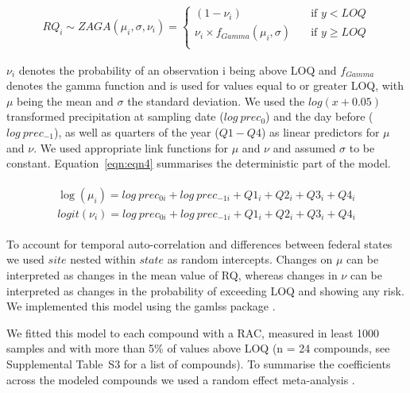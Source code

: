 \documentclass[journal=esthag,manuscript=article]{achemso}
\begin{document}
\begin{align}
RQ_i \sim ZAGA(\mu_i, \sigma, \nu_i) = 
  \begin{cases}
    (1 - \nu_i)   & \quad  \text{if } y < LOQ \\
    \nu_i \times f_{Gamma} (\mu_i, \sigma) & \quad \text{if } y \ge LOQ \\
  \end{cases}
  \label{eqn:eqn3}
\end{align}

$\nu_i$ denotes the probability of an observation i being above LOQ and $f_{Gamma}$ denotes the gamma function and is used for values equal to or greater LOQ, with $\mu$ being the mean and $\sigma$ the standard deviation.
We used the $log(x+0.05)$ transformed precipitation at sampling date ($log~prec_0$) and the day before ($log~prec_{-1}$), as well as quarters of the year ($Q1-Q4$) as linear predictors for $\mu$ and $\nu$. 
We used appropriate link functions for $\mu$ and $\nu$ and assumed $\sigma$ to be constant. 
Equation~\ref{eqn:eqn4} summarises the deterministic part of the model.

\begin{align}
\begin{split}
\log(\mu_{i}) = log~prec_{0 i} + log~prec_{-1 i} + Q1_{i} + Q2_{i}+Q3_{i}+Q4_{i}\\
logit(\nu_{i}) = log~prec_{0 i} + log~prec_{-1 i} + Q1_{i} + Q2_{i}+Q3_{i}+Q4_{i}
\end{split}
\label{eqn:eqn4}
\end{align}

To account for temporal auto-correlation and differences between federal states we used $site$ nested within $state$ as random intercepts.
Changes on $\mu$ can be interpreted as changes in the mean value of RQ, whereas changes in $\nu$ can be interpreted as changes in the probability of exceeding LOQ and showing any risk. 
We implemented this model using the gamlss package \cite{stasinopoulos_generalized_2007}.

We fitted this model to each compound with a RAC, measured in least 1000 samples and with more than 5\% of values above LOQ (n = 24 compounds, see Supplemental Table~S3 for a list of compounds). 
To summarise the coefficients across the modeled compounds we used a random effect meta-analysis \citep{harrison_getting_2011}.
\end{document}
